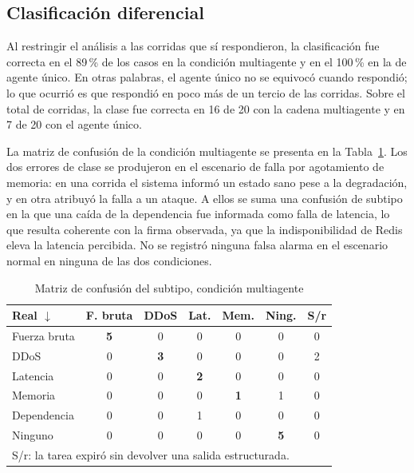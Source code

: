 \documentclass[conference]{IEEEtran}
\begin{document}
\subsection{Clasificación diferencial}
Al restringir el análisis a las corridas que sí respondieron, la clasificación fue
correcta en el 89\,\% de los casos en la condición multiagente y en el 100\,\% en la
de agente único. En otras palabras, el agente único no se equivocó cuando respondió;
lo que ocurrió es que respondió en poco más de un tercio de las corridas. Sobre el
total de corridas, la clase fue correcta en 16 de 20 con la cadena multiagente y en 7
de 20 con el agente único.

La matriz de confusión de la condición multiagente se presenta en la
Tabla~\ref{tab:confusion}. Los dos errores de clase se produjeron en el escenario de
falla por agotamiento de memoria: en una corrida el sistema informó un estado sano
pese a la degradación, y en otra atribuyó la falla a un ataque. A ellos se suma una
confusión de subtipo en la que una caída de la dependencia fue informada como falla
de latencia, lo que resulta coherente con la firma observada, ya que la indisponibilidad
de Redis eleva la latencia percibida. No se registró ninguna falsa alarma en el
escenario normal en ninguna de las dos condiciones.

\begin{table}[htbp]
\caption{Matriz de confusión del subtipo, condición multiagente}
\begin{center}
\footnotesize
\setlength{\tabcolsep}{3.4pt}
\begin{tabular}{@{}lcccccc@{}}
\toprule
\textbf{Real $\downarrow$} & \textbf{F. bruta} & \textbf{DDoS} & \textbf{Lat.} &
\textbf{Mem.} & \textbf{Ning.} & \textbf{S/r} \\
\midrule
Fuerza bruta  & \textbf{5} & 0 & 0 & 0 & 0 & 0 \\
DDoS          & 0 & \textbf{3} & 0 & 0 & 0 & 2 \\
Latencia      & 0 & 0 & \textbf{2} & 0 & 0 & 0 \\
Memoria       & 0 & 0 & 0 & \textbf{1} & 1 & 0 \\
Dependencia   & 0 & 0 & 1 & 0 & 0 & 0 \\
Ninguno       & 0 & 0 & 0 & 0 & \textbf{5} & 0 \\
\bottomrule
\multicolumn{7}{l}{\scriptsize S/r: la tarea expiró sin devolver una salida
estructurada.} \\
\end{tabular}
\label{tab:confusion}
\end{center}
\end{table}
\end{document}
